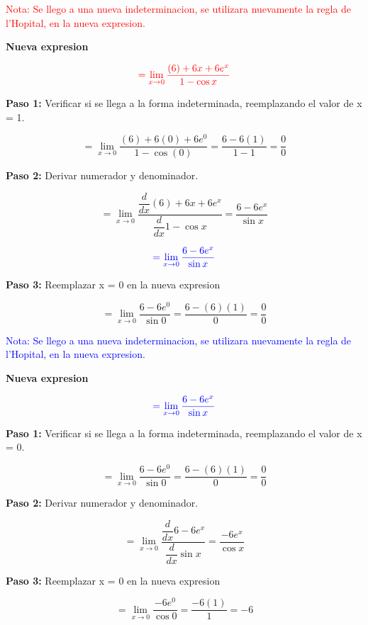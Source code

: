 \documentclass[12pt,a4paper]{article}
\begin{document}
\textcolor{red}{Nota: Se llego a una nueva indeterminacion, se utilizara nuevamente la regla de l'Hopital, en la nueva expresion.}

\vspace{0.2cm}

\textbf{Nueva expresion}

\[
\textcolor{red}{= \lim_{x \to 0} \frac{(6)+6x+6e^x}{1-\cos x}}
\]


\textbf{Paso 1:}
\vspace{0.2cm}
Verificar si se llega a la forma indeterminada, reemplazando el valor de x = 1.

\[
= \lim_{x \to 0} \frac{(6)+6(0)+6e^0}{1-\cos (0)}= \frac{6-6(1)}{1-1}= \frac{0}{0}
\]

\newpage

\textbf{Paso 2:}
\vspace{0.2cm}
Derivar numerador y denominador.

\[
= \lim_{x \to 0} \frac{\dfrac{d}{dx} (6)+6x+6e^x}{\dfrac{d}{dx} 1-\cos x}=  \frac{6-6e^x}{\sin x}
\]

\[
\textcolor{blue}{= \lim_{x \to 0} \frac{6-6e^x}{\sin x}}
\]

\textbf{Paso 3:}
\vspace{0.2cm}
Reemplazar x = 0 en la nueva expresion

\[
= \lim_{x \to 0} \frac{6-6e^0}{\sin 0}= \frac{6-(6)(1)}{0}= \frac{0}{0}
\]

\textcolor{blue}{Nota: Se llego a una nueva indeterminacion, se utilizara nuevamente la regla de l'Hopital, en la nueva expresion.}

\vspace{0.2cm}

\textbf{Nueva expresion}

\[
\textcolor{blue}{= \lim_{x \to 0} \frac{6-6e^x}{\sin x}}
\]


\textbf{Paso 1:}
\vspace{0.2cm}
Verificar si se llega a la forma indeterminada, reemplazando el valor de x = 0.

\[
= \lim_{x \to 0} \frac{6-6e^0}{\sin 0}= \frac{6-(6)(1)}{0}= \frac{0}{0}
\]


\textbf{Paso 2:}
\vspace{0.2cm}
Derivar numerador y denominador.

\[
= \lim_{x \to 0} \frac{\dfrac{d}{dx} 6-6e^x}{\dfrac{d}{dx} \sin x}=  \frac{-6e^x}{\cos x}
\]


\textbf{Paso 3:}
\vspace{0.2cm}
Reemplazar x = 0 en la nueva expresion

\[
= \lim_{x \to 0} \frac{-6e^0}{\cos 0}=\frac{-6(1)}{1}= -6
\]



\vspace{0.2cm}
\newpage

\vspace{0.2cm}
\end{document}
